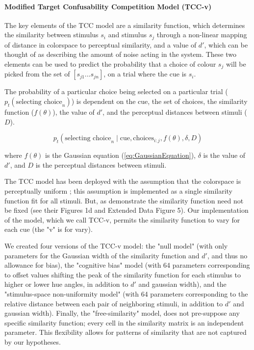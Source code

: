 \paragraph{Modified Target Confusability Competition Model (TCC-v)}\label{para:TCC}

The key elements of the TCC model are a similarity function, which determines the similarity between stimulus $s_i$ and stimulus $s_j$ through a non-linear mapping of distance in colorspace to perceptual similarity, and a value of $d'$, which can be thought of as describing the amount of noise acting in the system. 
These two elements can be used to predict the probability that a choice of colour $s_j$ will be picked from the set of $\left[s_{j1}...s_{jn}\right]$, on a trial where the cue is $s_i$. 

The probability of a particular choice being selected on a particular trial ($p_t(\text{selecting choice}_n)$) is dependent on the cue, the set of choices, the similarity function ($f(\theta)$), the value of $d'$, and the perceptual distances between stimuli ($D$).

\begin{equation} \label{eq:pt}
    p_t\left(\text{selecting choice}_n \mid \text{cue},\text{choices}_{i:j}, f(\theta), \delta, D\right)
\end{equation}

where $f(\theta)$ is the Gaussian equation (\autoref{eq:GaussianEquation}), $\delta$ is the value of $d'$, and $D$ is the perceptual distances between stimuli.

The TCC model has been deployed with the assumption that the colorspace is perceptually uniform \citet{schurgin_psychophysical_2020}; this assumption is implemented as a single similarity function fit for all stimuli. 
But, as \citet{schurgin_psychophysical_2020} demonstrate the similarity function need not be fixed (see their Figures 1d and Extended Data Figure 5). 
Our implementation of the model, which we call TCC-v, permits the similarity function to vary for each cue (the "v" is for vary). 

We created four versions of the TCC-v model: the "null model" (with only parameters for the Gaussian width of the similarity function and $d'$, and thus no allowance for bias), the "cognitive bias" model (with 64 parameters corresponding to offset values shifting the peak of the similarity function for each stimulus to higher or lower hue angles, in addition to $d'$ and gaussian width), and the "stimulus-space non-uniformity model" (with 64 parameters corresponding to the relative distance between each pair of neighboring stimuli, in addition to $d'$ and gaussian width). 
Finally, the "free-similarity" model, does not pre-suppose any specific similarity function; every cell in the similarity matrix is an independent parameter. 
This flexibility allows for patterns of similarity that are not captured by our hypotheses. 

